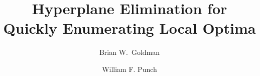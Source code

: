 \documentclass[runningheads,a4paper]{llncs}
\begin{document}
\mainmatter  %

\title{Hyperplane Elimination for Quickly Enumerating Local Optima}


%
%
\author{Brian W.~Goldman\and William F. Punch}

%


%
%

\maketitle
\end{document}
